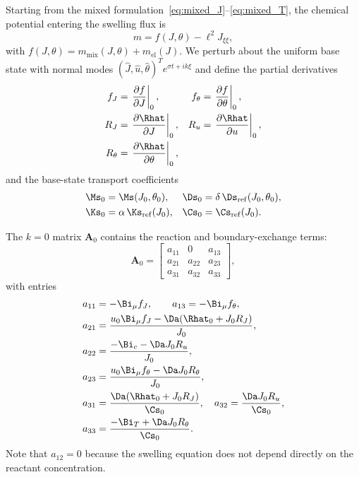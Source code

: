 Starting from the mixed
formulation~\eqref{eq:mixed_J}--\eqref{eq:mixed_T}, the chemical
potential entering the swelling flux is
\begin{equation}
  m = f(J,\theta) - \ell^2 J_{\xi\xi},
\end{equation}
with $f(J,\theta)=m_\mathrm{mix}(J,\theta)+m_\mathrm{el}(J)$.
We perturb about the uniform base state with normal modes
$(\widehat J,\widehat u,\widehat\theta)^T e^{\sigma t+ik\xi}$
and define the partial derivatives
\begin{subequations}
\begin{align}
  f_J &= \left.\frac{\partial f}{\partial J}\right|_0, &
  f_\theta &= \left.\frac{\partial f}{\partial \theta}\right|_0,
  \\
  R_J &= \left.\frac{\partial \Rhat}{\partial J}\right|_0, &
  R_u &= \left.\frac{\partial \Rhat}{\partial u}\right|_0,
  \\
  R_\theta &= \left.\frac{\partial \Rhat}{\partial \theta}\right|_0,
\end{align}
\end{subequations}
and the base-state transport coefficients
\begin{subequations}
\begin{align}
  \Ms_0 &= \Ms(J_0,\theta_0), &
  \Ds_0 &= \delta\,\Ds_\mathrm{ref}(J_0,\theta_0),
  \\
  \Ks_0 &= \alpha\,\Ks_\mathrm{ref}(J_0), &
  \Cs_0 &= \Cs_\mathrm{ref}(J_0).
\end{align}
\end{subequations}

The $k=0$ matrix $\mathbf A_0$ contains the reaction and
boundary-exchange terms:
\begin{equation}
  \mathbf A_0 =
  \begin{bmatrix}
    a_{11} & 0 & a_{13} \\
    a_{21} & a_{22} & a_{23} \\
    a_{31} & a_{32} & a_{33}
  \end{bmatrix},
  \label{eq:A0}
\end{equation}
with entries
\begin{subequations}
\label{eq:A0_entries}
\begin{align}
  a_{11} &= -\Bi_\mu f_J, \qquad
  a_{13} = -\Bi_\mu f_\theta, \\
  a_{21} &= \frac{u_0\Bi_\mu f_J
             - \Da(\Rhat_0 + J_0R_J)}{J_0}, \\
  a_{22} &= \frac{-\Bi_c - \Da J_0 R_u}{J_0}, \\
  a_{23} &= \frac{u_0\Bi_\mu f_\theta
             - \Da J_0 R_\theta}{J_0}, \\
  a_{31} &= \frac{\Da(\Rhat_0 + J_0R_J)}{\Cs_0}, \quad
  a_{32} = \frac{\Da J_0 R_u}{\Cs_0}, \\
  a_{33} &= \frac{-\Bi_T + \Da J_0R_\theta}{\Cs_0}.
\end{align}
\end{subequations}
Note that $a_{12}=0$ because the swelling equation does not depend
directly on the reactant concentration.

